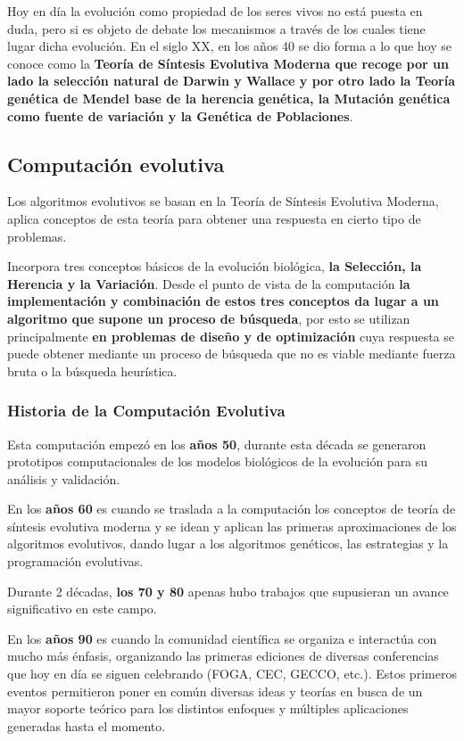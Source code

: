 \documentclass[12pt, twoside, openright]{report} %
\begin{document}
Hoy en día la evolución como propiedad de los seres vivos no está puesta en duda, pero si es objeto de debate los mecanismos a través de los cuales tiene lugar dicha evolución. En el siglo XX, en los años 40 se dio forma a lo que hoy se conoce como la \textbf{Teoría de Síntesis Evolutiva Moderna que recoge por un lado la selección natural de Darwin y Wallace y por otro lado la Teoría genética de Mendel base de la herencia genética, la Mutación genética como fuente de variación y la Genética de Poblaciones}.

\subsection{Computación evolutiva}
Los algoritmos evolutivos se basan en la Teoría de Síntesis Evolutiva Moderna, aplica conceptos de esta teoría para obtener una respuesta en cierto tipo de problemas.

Incorpora tres conceptos básicos de la evolución biológica, \textbf{la Selección, la Herencia y la Variación}. Desde el punto de vista de la computación \textbf{la implementación y combinación de estos tres conceptos da lugar a un algoritmo que supone un proceso de búsqueda}, por esto se utilizan principalmente \textbf{en problemas de diseño y de optimización} cuya respuesta se puede obtener mediante un proceso de búsqueda que no es viable mediante fuerza bruta o la búsqueda heurística.

\subsubsection{Historia de la Computación Evolutiva}
Esta computación empezó en los \textbf{años 50}, durante esta década se generaron prototipos computacionales de los modelos biológicos de la evolución para su análisis y validación.

En los \textbf{años 60} es cuando se traslada a la computación los conceptos de teoría de síntesis evolutiva moderna y se idean y aplican las primeras aproximaciones de los algoritmos evolutivos, dando lugar a los algoritmos genéticos, las estrategias y la programación evolutivas.

Durante 2 décadas, \textbf{los 70 y 80} apenas hubo trabajos que supusieran un avance significativo en este campo.

En los \textbf{años 90} es cuando la comunidad científica se organiza e interactúa con mucho más énfasis, organizando las primeras ediciones de diversas conferencias que hoy en día se siguen celebrando (FOGA, CEC, GECCO, etc.). Estos primeros eventos permitieron poner en común diversas ideas y teorías en busca de un mayor soporte teórico para los distintos enfoques y múltiples aplicaciones generadas hasta el momento.
\end{document}
